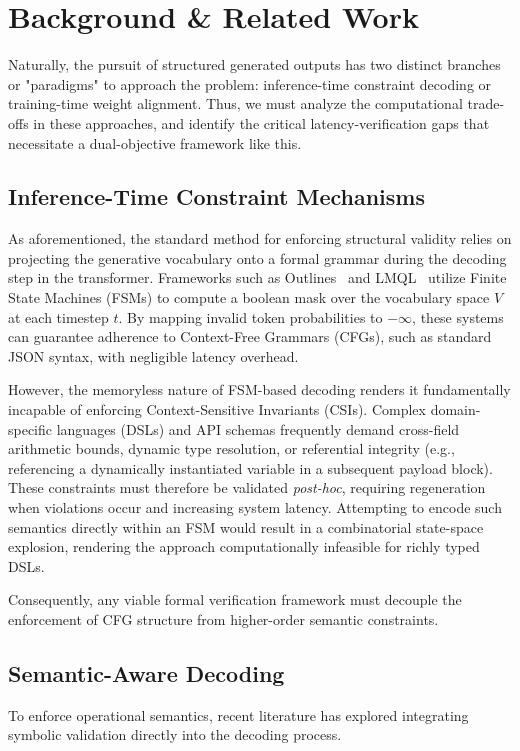 \section{Background \& Related Work}
Naturally, the pursuit of structured generated outputs has two distinct branches
or "paradigms" to approach the problem: inference-time constraint decoding or
training-time weight alignment. Thus, we must analyze the computational
trade-offs in these approaches, and identify the critical latency-verification
gaps that necessitate a dual-objective framework like this.

  \subsection{Inference-Time Constraint Mechanisms}
  As aforementioned, the standard method for enforcing structural validity relies
  on projecting the generative vocabulary onto a formal grammar during the
  decoding step in the transformer. Frameworks such as Outlines~\cite{willard2023efficient} and
  LMQL~\cite{beurer2023prompting} utilize Finite State Machines (FSMs) to compute a boolean mask over
  the vocabulary space $V$ at each timestep $t$. By mapping invalid token
  probabilities to $-\infty$, these systems can guarantee adherence to
  Context-Free Grammars (CFGs), such as standard JSON syntax, with negligible
  latency overhead.

  However, the memoryless nature of FSM-based decoding renders it fundamentally
  incapable of enforcing Context-Sensitive Invariants (CSIs). Complex
  domain-specific languages (DSLs) and API schemas frequently demand cross-field
  arithmetic bounds, dynamic type resolution, or referential integrity (e.g.,
  referencing a dynamically instantiated variable in a subsequent payload block).
  These constraints must therefore be validated \textit{post-hoc}, requiring
  regeneration when violations occur and increasing system latency. Attempting to
  encode such semantics directly within an FSM would result in a combinatorial
  state-space explosion, rendering the approach computationally infeasible for
  richly typed DSLs.

  Consequently, any viable formal verification framework must decouple the
  enforcement of CFG structure from higher-order semantic constraints.

  \subsection{Semantic-Aware Decoding}
  To enforce operational semantics, recent literature has explored integrating
  symbolic validation directly into the decoding process.

